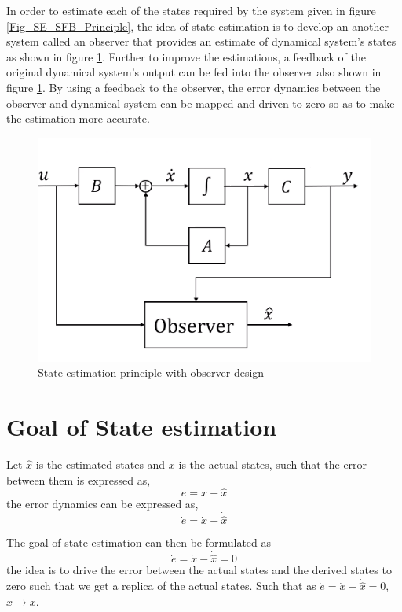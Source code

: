 In order to estimate each of the states required by the system given in figure \ref{Fig_SE_SFB_Principle}, the idea of state estimation is to develop an another system called an observer that provides an estimate of dynamical system's states as shown in figure \ref{Fig_SE_Principle}. Further to improve the estimations, a feedback of the original dynamical system's output can be fed into the observer also shown in figure \ref{Fig_SE_Principle}. By using a feedback to the observer, the error dynamics between the observer and dynamical system can be mapped and driven to zero so as to make the estimation more accurate.
\begin{figure}[h!]
	\centering
	\includegraphics[width=0.6\linewidth]{Bilder/SE_Observer_PRinciple}
	\caption{State estimation principle with observer design}
	\label{Fig_SE_Principle}
\end{figure}

\section{Goal of State estimation}\label{Sec_2_ch_26_goalOfObserver}

Let $\hat{x}$ is the estimated states and $x$ is the actual states, such that the error between them is expressed as,
\begin{equation}
	e = x - \hat{x}
\end{equation}
the error dynamics can be expressed as,
\begin{equation}
	\dot{e} = \dot{x} - \dot{\hat{x}}
\end{equation}

The goal of state estimation can then be formulated as $$ \dot{e} = \dot{x} - \dot{\hat{x}} = 0 $$ the idea is to drive the error between the actual states and the derived states to zero such that we get a replica of the actual states. Such that as $\dot{e} = \dot{x} - \dot{\hat{x}} = 0$, $\hat{x} \rightarrow x$.


